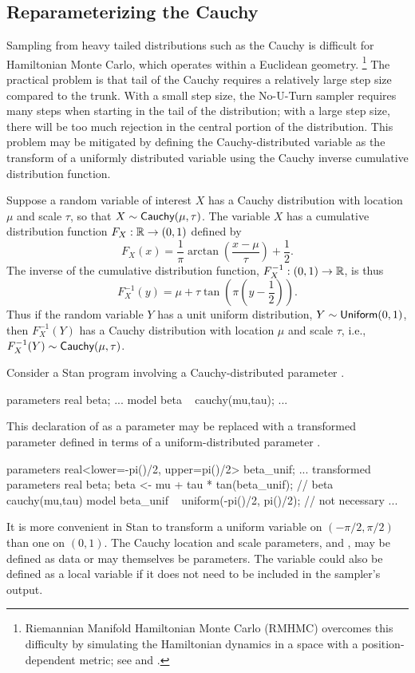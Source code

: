 \subsection{Reparameterizing the Cauchy}

Sampling from heavy tailed distributions such as the Cauchy is
difficult for Hamiltonian Monte Carlo, which operates within a
Euclidean geometry.%
%
\footnote{Riemannian Manifold Hamiltonian Monte Carlo (RMHMC) overcomes
  this difficulty by simulating the Hamiltonian dynamics in a space
  with a position-dependent metric; see
  \citep{GirolamiCalderhead:2011} and \citep{Betancourt:2012}.}
%
The practical problem is that tail of the Cauchy
requires a relatively large step size compared to the trunk.  With a
small step size, the No-U-Turn sampler requires many steps when
starting in the tail of the distribution; with a large step size,
there will be too much rejection in the central portion of the
distribution.  This problem may be mitigated by defining the
Cauchy-distributed variable as the transform of a uniformly
distributed variable using the Cauchy inverse cumulative distribution
function.

Suppose a random variable of interest $X$ has a Cauchy distribution
with location $\mu$ and scale $\tau$, so that $X \sim
\distro{Cauchy}(\mu,\tau)$.  The variable $X$ has a cumulative
distribution function $F_X:\reals \rightarrow (0,1)$ defined by
\[
F_X(x) = \frac{1}{\pi} \arctan \left( \frac{x - \mu}{\tau} \right) +
\frac{1}{2}.
\]
The inverse of the cumulative distribution function,
$F_X^{-1}:(0,1) \rightarrow \reals$, is thus
%
\[
F^{-1}_X(y) = \mu + \tau \tan \left( \pi \left( y - \frac{1}{2} \right) \right).
\]
Thus if the random variable $Y$ has a unit uniform distribution, $Y
\sim \distro{Uniform}(0,1)$, then $F^{-1}_X(Y)$ has a Cauchy
distribution with location $\mu$ and scale $\tau$, i.e., $F^{-1}_X(Y) \sim
\distro{Cauchy}(\mu,\tau)$. 

Consider a Stan program involving a Cauchy-distributed parameter
.
%
\begin{stancode}
parameters {
  real beta;
  ...
}
model {
  beta ~ cauchy(mu,tau);
  ...
}
\end{stancode}
%
This declaration of  as a parameter may be replaced with a
transformed parameter  defined in terms of a
uniform-distributed parameter .
%
\begin{stancode}
parameters {
  real<lower=-pi()/2, upper=pi()/2> beta_unif;
  ...
}
transformed parameters {
  real beta;
  beta <- mu + tau * tan(beta_unif);  // beta ~ cauchy(mu,tau)
}    
model {
  beta_unif ~ uniform(-pi()/2, pi()/2);  // not necessary
  ...
}
\end{stancode}
%
It is more convenient in Stan to transform a uniform variable on
$(-\pi/2, \pi/2)$ than one on $(0,1)$.  The Cauchy location and scale
parameters,  and , may be defined as data or may
themselves be parameters.  The variable  could also be
defined as a local variable if it does not need to be included in the
sampler's output.

